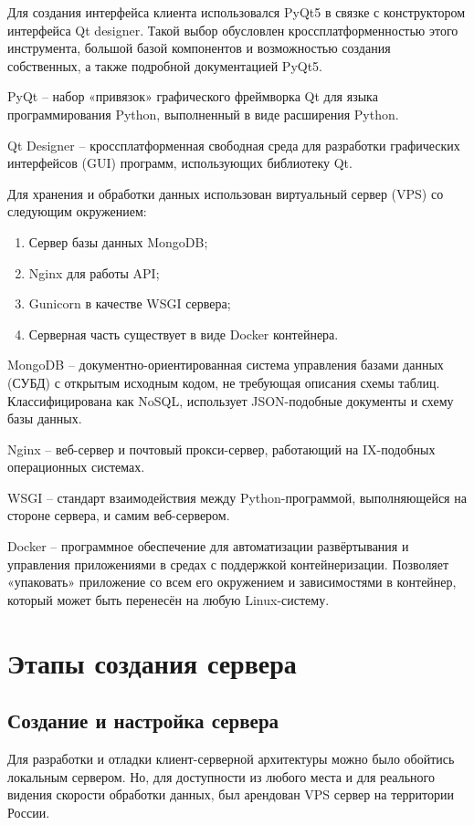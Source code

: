 \documentclass[14pt,a4paper,openbib]{extarticle}
\numberwithin{equation}{section}
\begin{document}
Для создания интерфейса клиента использовался PyQt5 в связке с конструктором интерфейса Qt designer. Такой выбор обусловлен кроссплатформенностью этого инструмента, большой базой компонентов и возможностью создания собственных, а также подробной документацией PyQt5.

PyQt – набор «привязок» графического фреймворка Qt для языка программирования Python, выполненный в виде расширения Python.

Qt Designer – кроссплатформенная свободная среда для разработки графических интерфейсов (GUI) программ, использующих библиотеку Qt.

Для хранения и обработки данных использован виртуальный сервер (VPS) со следующим окружением:
\begin{enumerate} 
    \item Сервер базы данных MongoDB;
    \item Nginx для работы API;
    \item Gunicorn в качестве WSGI сервера;
    \item Серверная часть существует в виде Docker контейнера.
\end{enumerate}
MongoDB – документно-ориентированная система управления базами данных (СУБД) с открытым исходным кодом, не требующая описания схемы таблиц. Классифицирована как NoSQL, использует JSON-подобные документы и схему базы данных.

Nginx – веб-сервер и почтовый прокси-сервер, работающий на IX-подобных операционных системах.

WSGI – стандарт взаимодействия между Python-программой, выполняющейся на стороне сервера, и самим веб-сервером.

Docker – программное обеспечение для автоматизации развёртывания и управления приложениями в средах с поддержкой контейнеризации. Позволяет «упаковать» приложение со всем его окружением и зависимостями в контейнер, который может быть перенесён на любую Linux-систему.


\newpage
\section{Этапы создания сервера}
\subsection{Создание и настройка сервера}
Для разработки и отладки клиент-серверной архитектуры можно было обойтись локальным сервером. Но, для доступности из любого места и для реального видения скорости обработки данных, был арендован VPS сервер на территории России.
\end{document}
